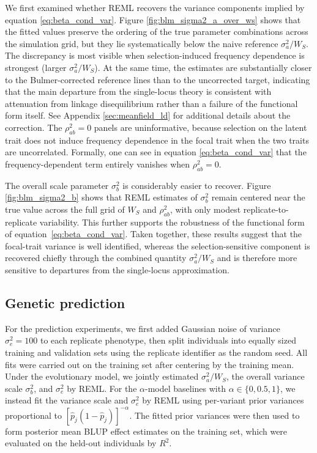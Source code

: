 \documentclass[10pt]{article}
\begin{document}
We first examined whether REML recovers the variance components implied by equation \eqref{eq:beta_cond_var}. 
Figure \ref{fig:blm_sigma2_a_over_ws} shows that the fitted values preserve the ordering of the true parameter combinations across the simulation grid, but they lie systematically below the naive reference $\sigma_a^2 / W_S$. 
The discrepancy is most visible when selection-induced frequency dependence is strongest (larger $\sigma_a^2 /W_S$). 
At the same time, the estimates are substantially closer to the Bulmer-corrected reference lines than to the uncorrected target, 
indicating that the main departure from the single-locus theory is consistent with attenuation from linkage disequilibrium rather than a failure of the functional form itself. 
See Appendix \ref{sec:meanfield_ld} for additional details about the correction.
The $\rho_{ab}^2=0$ panels are uninformative, because selection on the latent trait does not induce frequency dependence in the focal trait when the two traits are uncorrelated.
Formally, one can see in equation \eqref{eq:beta_cond_var} that the frequency-dependent term entirely vanishes when $\rho_{ab}^2=0$.

The overall scale parameter $\sigma_b^2$ is considerably easier to recover. Figure \ref{fig:blm_sigma2_b} shows that REML estimates of $\sigma_b^2$ remain centered near the true value across the full grid of $W_S$ and $\rho_{ab}^2$, with only modest replicate-to-replicate variability. 
This further supports the robustness of the functional form of equation~\eqref{eq:beta_cond_var}.
Taken together, these results suggest that the focal-trait variance is well identified, 
whereas the selection-sensitive component is recovered chiefly through the combined quantity $\sigma_a^2 / W_S$ and is therefore more sensitive to departures from the single-locus approximation.

\subsection{Genetic prediction}

For the prediction experiments, we first added Gaussian noise of variance $\sigma_e^2=100$ to each replicate phenotype, 
then split individuals into equally sized training and validation sets using the replicate identifier as the random seed.
All fits were carried out on the training set after centering by the training mean. Under the evolutionary model, 
we jointly estimated $\sigma_a^2/W_S$, the overall variance scale $\sigma_b^2$, and $\sigma_e^2$ by REML. 
For the $\alpha$-model baselines with $\alpha \in \{0, 0.5, 1\}$, we instead fit the variance scale and $\sigma_e^2$ by REML using per-variant prior variances proportional to $[\hat p_j(1-\hat p_j)]^{-\alpha}$. 
The fitted prior variances were then used to form posterior mean BLUP effect estimates on the training set, which were evaluated on the held-out individuals by $R^2$.
\end{document}
